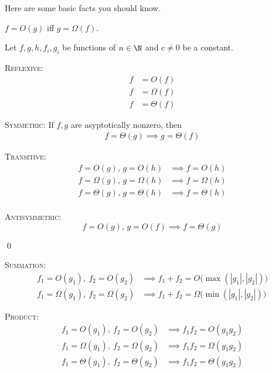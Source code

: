 Here are some basic facts you should know.

\begin{prop}
  $f = O(g)$ iff $g = \Omega(f)$.
\end{prop}

\begin{prop}
  Let $f, g, h, f_i, g_i$ be functions of $n \in \N$ and $c \neq 0$ be a constant.
  \begin{myenum}
  \item
    \textsc{Reflexive:}
    \begin{align*}
    f &= O(f) \\
    f &= \Omega(f) \\
    f &= \Theta(f) 
    \end{align*}
  \item
    \textsc{Symmetric:}
    If $f,g$ are asyptotically nonzero, then
    \begin{align*}
    f = \Theta(g) \implies g = \Theta(f)
    \end{align*}  
  \item
    \textsc{Transitive:}
    \begin{align*}
    f = O(g) \text{, } g = O(h) &\implies f = O(h) \\
    f = \Omega(g) \text{, } g = \Omega(h) &\implies f = \Omega(h) \\
    f = \Theta(g) \text{, } g = \Theta(h) &\implies f = \Theta(h) \\
    \end{align*}
  \item
    \textsc{Antisymmetric:}
    \[
    f = O(g) \text{, } g = O(f) \implies f = \Theta(g)
    \]
  \end{myenum}
  \qed
\end{prop}

\begin{prop}
  \mbox{}
  \begin{myenum}
  \item
    \textsc{Summation:}
    \begin{align*}
    f_1 = O(g_1), \ f_2 = O(g_2) &\implies f_1 + f_2 = O \bigl( \max(|g_1|,|g_2|) \bigr) \\
    f_1 = \Omega(g_1), \ f_2 = \Omega(g_2) &\implies f_1 + f_2 = \Omega \bigl( \min(|g_1|,|g_2|) \bigr)
    \end{align*}
  \item
    \textsc{Product:}
    \begin{align*}
    f_1 = O(g_1), \ f_2 = O(g_2) &\implies f_1 f_2 = O(g_1 g_2) \\
    f_1 = \Omega(g_1), \ f_2 = \Omega(g_2) &\implies f_1 f_2 = \Omega(g_1 g_2) \\
    f_1 = \Theta(g_1), \ f_2 = \Theta(g_2) &\implies f_1 f_2 = \Theta(g_1 g_2) \\
    \end{align*}
  \end{myenum}
\end{prop}


